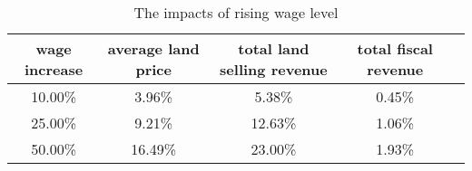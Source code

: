 \begin{table}[H]
\centering
\caption{The impacts of rising wage level}
\label{table: increase_wage}
\begin{tabular}{ccccc}
\toprule
wage increase & average land price & total land selling revenue & total fiscal revenue \\
\midrule
10.00\% & 3.96\% & 5.38\% & 0.45\% \\
25.00\% & 9.21\% & 12.63\% & 1.06\% \\
50.00\% & 16.49\% & 23.00\% & 1.93\% \\
\bottomrule
\end{tabular}
\end{table}
